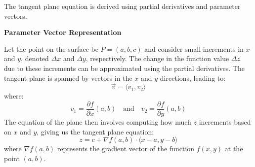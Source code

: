 \documentclass{report}
\begin{document}
The tangent plane equation is derived using partial derivatives and parameter vectors.

\textbf{Parameter Vector Representation}

Let the point on the surface be \(P = (a, b, c)\) and consider small increments in \(x\) and \(y\), denoted \(\Delta x\) and \(\Delta y\), respectively. The change in the function value \(\Delta z\) due to these increments can be approximated using the partial derivatives. The tangent plane is spanned by vectors in the \(x\) and \(y\) directions, leading to:
\[
	\vec{v} = \langle v_1, v_2 \rangle
\]
where:
\[
	v_1 = \frac{\partial f}{\partial x}(a, b) \quad \text{and} \quad v_2 = \frac{\partial f}{\partial y}(a, b)
\]
The equation of the plane then involves computing how much \(z\) increments based on \(x\) and \(y\), giving us the tangent plane equation:
\[
	z = c + \nabla f(a, b) \cdot \langle x - a, y - b \rangle
\]
where \(\nabla f(a, b)\) represents the gradient vector of the function \(f(x, y)\) at the point \((a, b)\).

\end{document}
